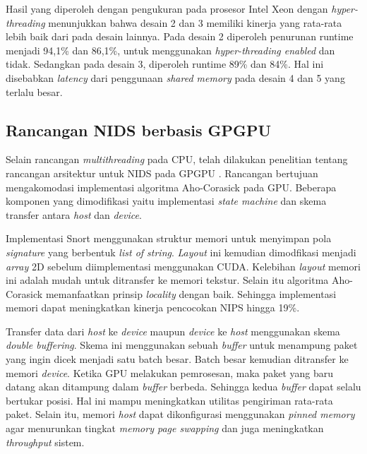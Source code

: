     Hasil yang diperoleh dengan pengukuran pada prosesor Intel Xeon dengan \emph{hyper-threading} menunjukkan bahwa desain 2 dan 3 memiliki kinerja yang rata-rata lebih baik dari pada desain lainnya. Pada desain 2 diperoleh penurunan runtime menjadi 94,1\% dan 86,1\%, untuk menggunakan \emph{hyper-threading enabled} dan tidak. Sedangkan pada desain 3, diperoleh runtime 89\% dan 84\%. Hal ini disebabkan \emph{latency} dari penggunaan \emph{shared memory} pada desain 4 dan 5 yang terlalu besar.

  \subsection{Rancangan NIDS berbasis GPGPU}

    Selain rancangan \emph{multithreading} pada CPU, telah dilakukan penelitian tentang rancangan arsitektur untuk NIDS pada GPGPU \citep{gnort2008}. Rancangan bertujuan mengakomodasi implementasi algoritma Aho-Corasick pada GPU. Beberapa komponen yang dimodifikasi yaitu implementasi \emph{state machine} dan skema transfer antara \emph{host} dan \emph{device}.

    Implementasi Snort menggunakan struktur memori untuk menyimpan pola \emph{signature} yang berbentuk \emph{list of string}. \emph{Layout} ini kemudian dimodfikasi menjadi \emph{array} 2D sebelum diimplementasi menggunakan CUDA. Kelebihan \emph{layout} memori ini adalah mudah untuk ditransfer ke memori tekstur. Selain itu algoritma Aho-Corasick memanfaatkan prinsip \emph{locality} dengan baik. Sehingga implementasi memori dapat meningkatkan kinerja pencocokan NIPS hingga 19\%.

    Transfer data dari \emph{host} ke \emph{device} maupun \emph{device} ke \emph{host} menggunakan skema \emph{double buffering}. Skema ini menggunakan sebuah \emph{buffer} untuk menampung paket yang ingin dicek menjadi satu batch besar. Batch besar kemudian ditransfer ke memori \emph{device}. Ketika GPU melakukan pemrosesan, maka paket yang baru datang akan ditampung dalam \emph{buffer} berbeda. Sehingga kedua \emph{buffer} dapat selalu bertukar posisi. Hal ini mampu meningkatkan utilitas pengiriman rata-rata paket. Selain itu, memori \emph{host} dapat dikonfigurasi menggunakan \emph{pinned memory} agar menurunkan tingkat \emph{memory page swapping} dan juga meningkatkan \emph{throughput} sistem.

